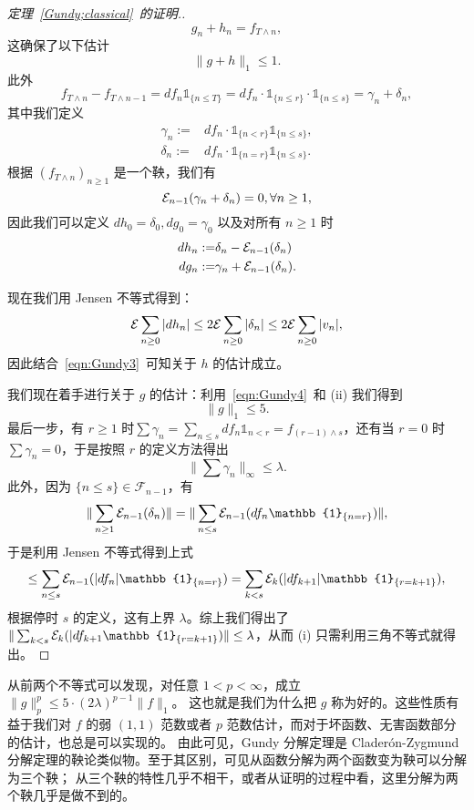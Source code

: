 \begin{proof}[定理~\ref{Gundy;classical}~的证明.]
            \[g_n+h_n=f_{T\wedge n},\]
        这确保了以下估计
        \begin{equation}
            \|g+h\|_1\leq 1.
        \end{equation}
        此外
            \[f_{T\wedge{n}}-f_{T\wedge{n-1}}=df_n\mathbb{1}_{\{n\leq T\}}=df_n\cdot\mathbb{1}_{\{n\leq r\}}\cdot\mathbb{1}_{\{n\leq s\}}=\gamma_n+\delta_n,\]
        其中我们定义
            \begin{align*}
                \gamma_n:=&df_n\cdot\mathbb{1}_{\{n<r\}}\mathbb{1}_{\{n\leq s\}},\\
                \delta_n:=&df_n\cdot\mathbb{1}_{\{n=r\}}\mathbb{1}_{\{n\leq s\}}.
            \end{align*}
        根据 $(f_{T\wedge n})_{n\geq1}$ 是一个鞅，我们有
            \[\mathcal{E}_{n-1}(\gamma_n+\delta_n)=0,\forall n\geq1,\]
        因此我们可以定义 $dh_0=\delta_0,dg_0=\gamma_0$ 以及对所有 $n\geq1$ 时
            \begin{align*}
                dh_n:=&\delta_n-\mathcal{E}_{n-1}(\delta_n)\\
                dg_n:=&\gamma_n+\mathcal{E}_{n-1}(\delta_n).
            \end{align*}
        \par 现在我们用 Jensen 不等式得到：
            \[\mathcal{E}\sum_{n\geq0}|dh_n|\leq2\mathcal{E}\sum_{n\geq0}|\delta_n|\leq2\mathcal{E}\sum_{n\geq0}|v_n|,\]
        因此结合~\eqref{eqn:Gundy3}~可知关于 $h$ 的估计成立。
        \par 我们现在着手进行关于 $g$ 的估计：利用~\eqref{eqn:Gundy4}~和 (ii) 我们得到
            \[\|g\|_1\leq 5.\]
        最后一步，有 $r\geq1$ 时$\sum{\gamma_n}=\sum_{n\leq s}df_n\mathbb{1}_{n<r}=f_{(r-1)\wedge s}$，还有当 $r=0$ 时 $\sum\gamma_n=0$，于是按照 $r$ 的定义方法得出
            \[\|\sum\gamma_n\|_{\infty}\leq\lambda.\]
        此外，因为 $\{n\leq s\}\in\mathcal{F}_{n-1}$，有
            \[\|\sum_{n\geq1}\E_{n-1}(\delta_n)\|=\|\sum_{n\leq s}\E_{n-1}(df_n\mathbb{1}_{\{n=r\}})\|,  \]
        于是利用 Jensen 不等式得到上式
            \[\leq\sum_{n\leq s}\E_{n-1}(|df_n|\mathbb{1}_{\{n=r\}})=\sum_{k<s}\E_{k}(|df_{k+1}|\mathbb{1}_{\{r=k+1\}}),\]
        根据停时 $s$ 的定义，这有上界 $\lambda$。综上我们得出了 $\|\sum_{k<s}\E_k(|df_{k+1}\mathbb{1}_{\{r=k+1\}})\|\leq \lambda$，从而 (i) 只需利用三角不等式就得出。
    \end{proof}

\begin{remark}
    从前两个不等式可以发现，对任意 $1< p< \infty$，成立 $\|g\|_p^p\leq  5\cdot(2\lambda)^{p-1} \|f\|_1$。
    这也就是我们为什么把 $g$ 称为好的。这些性质有益于我们对 $f$ 的弱 $(1,1)$ 范数或者 $p$ 范数估计，而对于坏函数、无害函数部分的估计，也总是可以实现的。
    由此可见，Gundy 分解定理是 Clader\'on-Zygmund 分解定理的鞅论类似物。至于其区别，可见从函数分解为两个函数变为鞅可以分解为三个鞅；
    从三个鞅的特性几乎不相干，或者从证明的过程中看，这里分解为两个鞅几乎是做不到的。
\end{remark}

